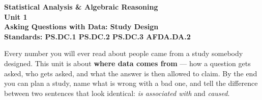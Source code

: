 
\vspace{-0.72in}

\begin{center}
  {\color{white}\textbf{\LARGE Statistical Analysis \& Algebraic Reasoning}}\\[4pt]
  {\color{frostmid}\large\textbf{Unit 1}}\\[6pt]
  {\color{white}\textbf{\Large Asking Questions with Data: Study Design}}\\[5pt]
  {\color{frostmid}\small\textbf{Standards: PS.DC.1 \quad PS.DC.2 \quad PS.DC.3 \quad AFDA.DA.2}}
\end{center}

\vspace{0.20in}
\namedateperiod
\vspace{0.14in}

\begin{objectivebox}
\small
Every number you will ever read about people came from a study somebody
designed. This unit is about \textbf{where data comes from} --- how a question
gets asked, who gets asked, and what the answer is then allowed to claim. By
the end you can plan a study, name what is wrong with a bad one, and tell the
difference between two sentences that look identical: \emph{is associated with}
and \emph{caused}.
\end{objectivebox}

\vspace{0.12in}

